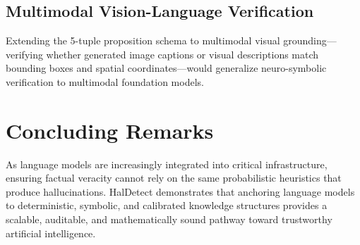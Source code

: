 \subsection{Multimodal Vision-Language Verification}
Extending the 5-tuple proposition schema to multimodal visual grounding---verifying whether generated image captions or visual descriptions match bounding boxes and spatial coordinates---would generalize neuro-symbolic verification to multimodal foundation models.

\section{Concluding Remarks}
\label{sec:concluding_remarks}

As language models are increasingly integrated into critical infrastructure, ensuring factual veracity cannot rely on the same probabilistic heuristics that produce hallucinations. HalDetect demonstrates that anchoring language models to deterministic, symbolic, and calibrated knowledge structures provides a scalable, auditable, and mathematically sound pathway toward trustworthy artificial intelligence.
